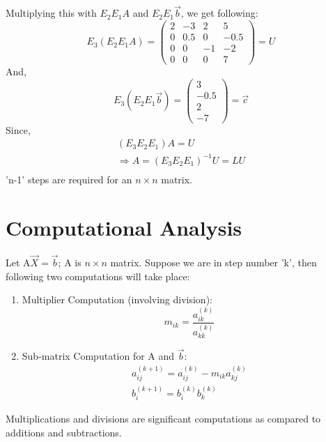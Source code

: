 \documentclass[12pt, oneside,table]{report}
\newcommand{\?}{\stackrel{?}{=}}
\theoremstyle{definition}
\begin{document}
Multiplying this with $E_{2}E_{1}A$ and $E_{2}E_{1}\overrightarrow{b}$, we get following:
\begin{equation}
    E_{3}\left(E_{2}E_{1}A\right)=
    \begin{pmatrix}
    2&-3&2&5\\
    0&0.5&0&-0.5\\
    0&0&-1&-2\\
    0&0&0&7
    \end{pmatrix}=U
\end{equation}
And,
\begin{equation}
    E_{3}\left(E_{2}E_{1}\overrightarrow{b}\right)=
    \begin{pmatrix}
    3\\
    -0.5\\
    2\\
    -7
    \end{pmatrix}=\overrightarrow{c}
\end{equation}
Since, 
\begin{equation}
\begin{matrix}
    \left(E_{3}E_{2}E_{1}\right)A=U\\
    \Rightarrow A=\left(E_{3}E_{2}E_{1}\right)^{-1}U=LU\\
    \end{matrix}
\end{equation}
 'n-1' steps are required for an $n\times n$ matrix.\\
\section{Computational Analysis}
Let A$\overrightarrow{X}=\overrightarrow{b}$; A is $n\times n$ matrix. Suppose we are in step number 'k', then following two computations will take place:

\begin{enumerate}
    \item Multiplier Computation (involving division):
    \begin{equation}
        m_{ik}=\frac{a_{ik}^{\left(k\right)}}{a_{kk}^{\left(k\right)}}
    \end{equation}
    \item Sub-matrix Computation for A and $\overrightarrow{b}$:
    \begin{equation}
        \begin{matrix}
            
        a_{ij}^{\left(k+1\right)}=a_{ij}^{\left(k\right)}-m_{ik}a_{kj}^{\left(k\right)}\\
        b_{i}^{\left(k+1\right)}=b_{i}^{\left(k\right)}b_{k}^{\left(k\right)}
        \end{matrix}
    \end{equation}
\end{enumerate}
Multiplications and divisions are significant computations as compared to additions and subtractions. 
\end{document}
